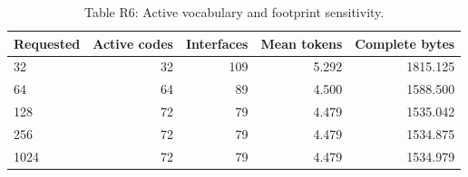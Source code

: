 \begin{table}[t]
\centering
\caption{Table R6: Active vocabulary and footprint sensitivity.}
\begin{tabular}{lrrrr}
\toprule
Requested & Active codes & Interfaces & Mean tokens & Complete bytes \\
\midrule
32 & 32 & 109 & 5.292 & 1815.125 \\
64 & 64 & 89 & 4.500 & 1588.500 \\
128 & 72 & 79 & 4.479 & 1535.042 \\
256 & 72 & 79 & 4.479 & 1534.875 \\
1024 & 72 & 79 & 4.479 & 1534.979 \\
\bottomrule
\end{tabular}
\end{table}
